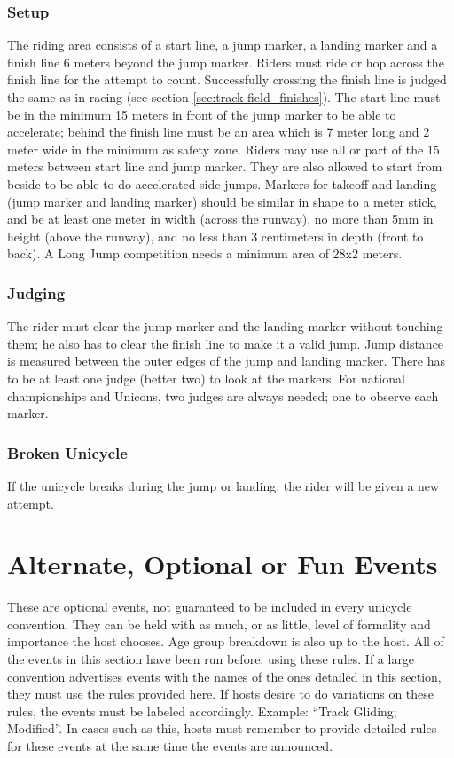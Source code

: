 \subsubsection{Setup}
The riding area consists of a start line, a jump marker, a landing marker and a finish line 6 meters beyond the jump marker.
Riders must ride or hop across the finish line for the attempt to count.
Successfully crossing the finish line is judged the same as in racing (see section \ref{sec:track-field_finishes}).
The start line must be in the minimum 15 meters in front of the jump marker to be able to accelerate; behind the finish line must be an area which is 7 meter long and 2 meter wide in the minimum as safety zone.
Riders may use all or part of the 15 meters between start line and jump marker.
They are also allowed to start from beside to be able to do accelerated side jumps.
Markers for takeoff and landing (jump marker and landing marker) should be similar in shape to a meter stick, and be at least one meter in width (across the runway), no more than 5mm in height (above the runway), and no less than 3 centimeters in depth (front to back).
A Long Jump competition needs a minimum area of 28x2 meters.

\subsubsection{Judging}
The rider must clear the jump marker and the landing marker without touching them; he also has to clear the finish line to make it a valid jump.
Jump distance is measured between the outer edges of the jump and landing marker.
There has to be at least one judge (better two) to look at the markers.
For national championships and Unicons, two judges are always needed; one to observe each marker.

\subsubsection{Broken Unicycle}
If the unicycle breaks during the jump or landing, the rider will be given a new attempt.

\section{Alternate, Optional or Fun Events \label{sec:track-field_alternate-optional-fun-events}}
These are optional events, not guaranteed to be included in every unicycle convention.
They can be held with as much, or as little, level of formality and importance the host chooses.
Age group breakdown is also up to the host.
All of the events in this section have been run before, using these rules.
If a large convention advertises events with the names of the ones detailed in this section, they must use the rules provided here.
If hosts desire to do variations on these rules, the events must be labeled accordingly.
Example: ``Track Gliding; Modified''.
In cases such as this, hosts must remember to provide detailed rules for these events at the same time the events are announced.

